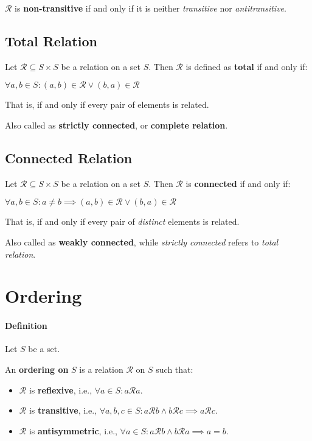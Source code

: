 $\mathcal{R}$ is \textbf{non-transitive} if and only if it is neither
\textit{transitive} nor \textit{antitransitive}.


\subsection{Total Relation}
\label{sec:total-relation}
Let $\mathcal{R} \subseteq S \times S$ be a relation on a set
$S$. Then $\mathcal{R}$ is defined as \textbf{total} if and only if:

$\forall a, b \in S : (a, b) \in \mathcal{R} \lor (b, a) \in
\mathcal{R}$

That is, if and only if every pair of elements is related.


Also called as \textbf{strictly connected}, or \textbf{complete
  relation}.

\subsection{Connected Relation}
\label{sec:connected-relation}

Let $\mathcal{R} \subseteq S \times S$ be a relation on a set
$S$. Then $\mathcal{R}$ is \textbf{connected} if and only if:

$\forall a, b \in S: a \neq b \implies (a, b) \in \mathcal{R} \lor
(b,a) \in \mathcal{R}$

That is, if and only if every pair of \textit{distinct} elements is
related.


Also called as \textbf{weakly connected}, while \textit{strictly
  connected} refers to \textit{total relation}.


\section{Ordering}
\label{sec:ordering}

\paragraph{Definition}

Let $S$ be a set.

An \textbf{ordering on} $S$ is a relation $\mathcal{R}$ on $S$ such
that:

\begin{itemize}
\item $\mathcal{R}$ is \textbf{reflexive}, i.e., $\forall a \in S: a \mathcal{R} a$.
\item $\mathcal{R}$ is \textbf{transitive}, i.e.,
  $\forall a, b, c \in S: a \mathcal{R} b \land b \mathcal{R} c
  \implies a \mathcal{R} c$.
\item $\mathcal{R}$ is \textbf{antisymmetric}, i.e.,
  $\forall a \in S : a \mathcal{R} b \land b \mathcal{R} a \implies a
  = b$.
\end{itemize}

